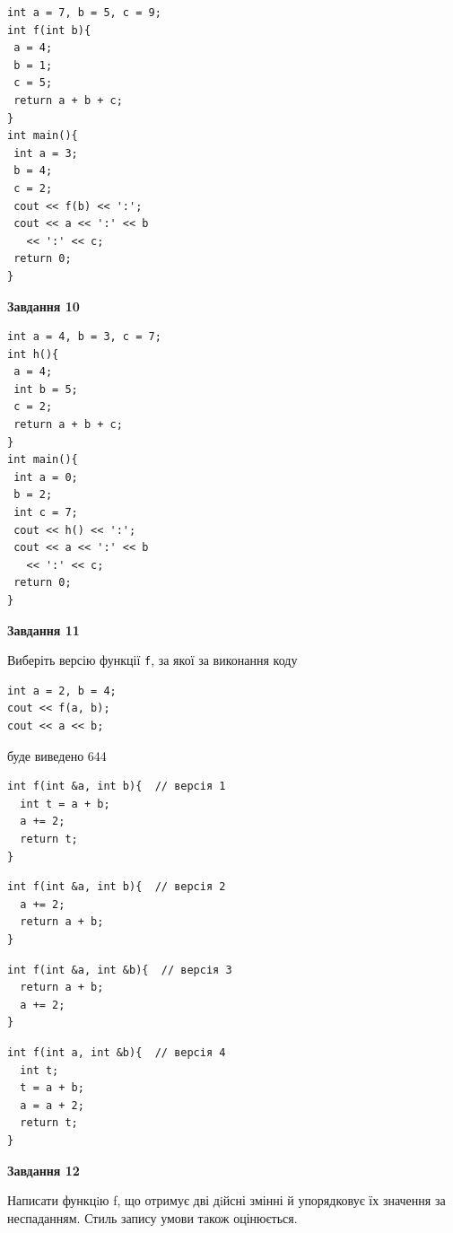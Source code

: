 \documentclass[12pt, ukrainian]{article}
\def\code#1{\Verb!#1!}
\begin{document}
{\begin {large}
\begin{minipage}[t]{7.0cm}
\begin{verbatim}
int a = 7, b = 5, c = 9;
int f(int b){
 a = 4;
 b = 1;
 c = 5;
 return a + b + c;
}
int main(){
 int a = 3;
 b = 4;
 c = 2;
 cout << f(b) << ':';
 cout << a << ':' << b 
   << ':' << c;
 return 0;
}
\end{verbatim}



\begin{center}
\textbf{Завдання 10}
\end{center}
\vspace{-8mm}

\begin{verbatim}
int a = 4, b = 3, c = 7;
int h(){
 a = 4;
 int b = 5;
 c = 2;
 return a + b + c;
}
int main(){
 int a = 0;
 b = 2;
 int c = 7;
 cout << h() << ':';
 cout << a << ':' << b 
   << ':' << c;
 return 0;
}
\end{verbatim}

\end{minipage}
\vline \hspace{1mm}
\begin{minipage}[t]{11.0cm}

\begin{center}
\textbf{Завдання 11}
\end{center}
Виберіть версію функції \code{f}, за якої за виконання коду
\begin{verbatim}
int a = 2, b = 4;
cout << f(a, b);
cout << a << b;
\end{verbatim}

буде виведено 644

\begin{verbatim}
int f(int &a, int b){  // версія 1
  int t = a + b;
  a += 2;
  return t;
}
\end{verbatim}

\vspace{-8mm}\begin{verbatim}
int f(int &a, int b){  // версія 2
  a += 2;
  return a + b;
}
\end{verbatim}

\vspace{-8mm}\begin{verbatim}
int f(int &a, int &b){  // версія 3
  return a + b;
  a += 2;
}
\end{verbatim}

\vspace{-8mm}\begin{verbatim}
int f(int a, int &b){  // версія 4
  int t;
  t = a + b;
  a = a + 2;
  return t;
}
\end{verbatim}



\begin{center}
\textbf{Завдання 12}
\end{center}

Написати функцiю f, що отримує дві дiйсні змінні й упорядковує їх значення за неспаданням. Стиль запису умови також оцінюється.\par

\end{minipage}

\end {large}}
\newpage
\end{document}
